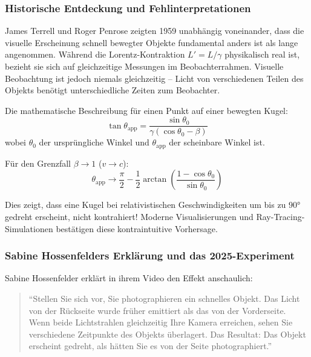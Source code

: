 	\subsubsection{Historische Entdeckung und Fehlinterpretationen}
	
	James Terrell \cite{terrell1959} und Roger Penrose \cite{penrose1959} zeigten 1959 unabhängig voneinander, dass die visuelle Erscheinung schnell bewegter Objekte fundamental anders ist als lange angenommen. Während die Lorentz-Kontraktion $L' = L/\gamma$ physikalisch real ist, bezieht sie sich auf gleichzeitige Messungen im Beobachterrahmen. Visuelle Beobachtung ist jedoch niemals gleichzeitig – Licht von verschiedenen Teilen des Objekts benötigt unterschiedliche Zeiten zum Beobachter.
	
	Die mathematische Beschreibung für einen Punkt auf einer bewegten Kugel:
	\begin{equation}
		\tan\theta_{\text{app}} = \frac{\sin\theta_0}{\gamma(\cos\theta_0 - \beta)}
	\end{equation}
	wobei $\theta_0$ der ursprüngliche Winkel und $\theta_{\text{app}}$ der scheinbare Winkel ist.
	
	Für den Grenzfall $\beta \to 1$ ($v \to c$):
	\begin{equation}
		\theta_{\text{app}} \to \frac{\pi}{2} - \frac{1}{2}\arctan\left(\frac{1-\cos\theta_0}{\sin\theta_0}\right)
	\end{equation}
	
	Dies zeigt, dass eine Kugel bei relativistischen Geschwindigkeiten um bis zu $90°$ gedreht erscheint, nicht kontrahiert! Moderne Visualisierungen \cite{weiskopf2000, mueller2014} und Ray-Tracing-Simulationen bestätigen diese kontraintuitive Vorhersage.
	
	\subsubsection{Sabine Hossenfelders Erklärung und das 2025-Experiment}
	
	Sabine Hossenfelder erklärt in ihrem Video \cite{hossenfelder2025} den Effekt anschaulich:
	
	\begin{quote}
		``Stellen Sie sich vor, Sie photographieren ein schnelles Objekt. Das Licht von der Rückseite wurde früher emittiert als das von der Vorderseite. Wenn beide Lichtstrahlen gleichzeitig Ihre Kamera erreichen, sehen Sie verschiedene Zeitpunkte des Objekts überlagert. Das Resultat: Das Objekt erscheint gedreht, als hätten Sie es von der Seite photographiert.''
	\end{quote}
	
